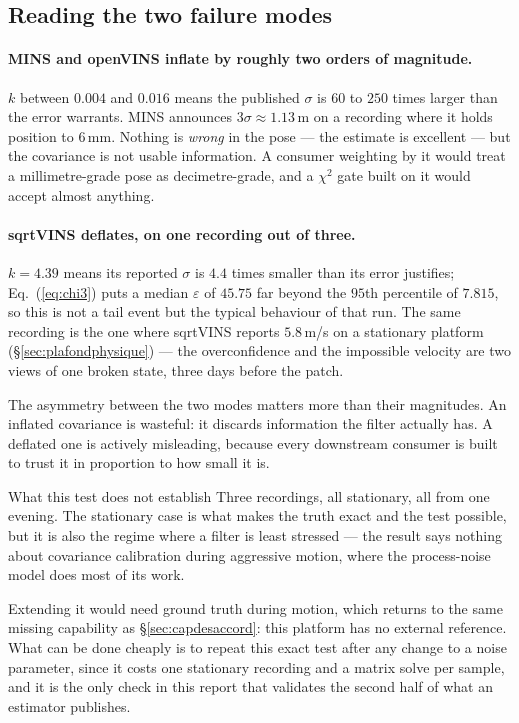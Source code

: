 \subsection{Reading the two failure modes}

\paragraph{MINS and openVINS inflate by roughly two orders of magnitude.}
$k$ between $0.004$ and $0.016$ means the published $\sigma$ is $60$ to
$250$ times larger than the error warrants. MINS announces $3\sigma \approx
1.13$\,m on a recording where it holds position to $6$\,mm. Nothing is
\emph{wrong} in the pose --- the estimate is excellent --- but the
covariance is not usable information. A consumer weighting by it would
treat a millimetre-grade pose as decimetre-grade, and a $\chi^2$ gate built
on it would accept almost anything.

\paragraph{sqrtVINS deflates, on one recording out of three.} $k = 4.39$
means its reported $\sigma$ is $4.4$ times smaller than its error justifies;
Eq.~(\ref{eq:chi3}) puts a median $\varepsilon$ of $45.75$ far beyond the
$95$th percentile of $7.815$, so this is not a tail event but the typical
behaviour of that run. The same recording is the one where sqrtVINS reports
$5.8$\,m/s on a stationary platform (\S\ref{sec:plafondphysique}) --- the
overconfidence and the impossible velocity are two views of one broken
state, three days before the  patch.

The asymmetry between the two modes matters more than their magnitudes. An
inflated covariance is wasteful: it discards information the filter actually
has. A deflated one is actively misleading, because every downstream
consumer is built to trust it in proportion to how small it is.

\begin{trapbox}{What this test does not establish}
Three recordings, all stationary, all from one evening. The stationary case
is what makes the truth exact and the test possible, but it is also the
regime where a filter is least stressed --- the result says nothing about
covariance calibration during aggressive motion, where the process-noise
model does most of its work.

Extending it would need ground truth during motion, which returns to the
same missing capability as \S\ref{sec:capdesaccord}: this platform has no
external reference. What can be done cheaply is to repeat this exact test
after any change to a noise parameter, since it costs one stationary
recording and a matrix solve per sample, and it is the only check in this
report that validates the second half of what an estimator publishes.
\end{trapbox}

